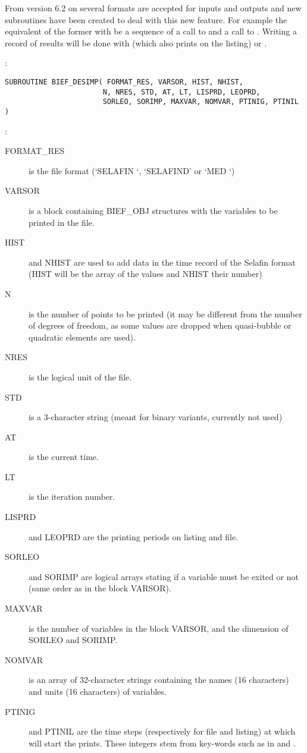 From version 6.2 on several formats are accepted for inputs and outputs and new
subroutines have been created to deal with this new feature. For example the
equivalent of the former  with be a sequence of a call to
 and a call to . Writing a record
of results will be done with  (which also prints on the
listing) or .

:
\begin{lstlisting}[language=TelFortran]
SUBROUTINE BIEF_DESIMP( FORMAT_RES, VARSOR, HIST, NHIST,
                       N, NRES, STD, AT, LT, LISPRD, LEOPRD,
                       SORLEO, SORIMP, MAXVAR, NOMVAR, PTINIG, PTINIL )
\end{lstlisting}

:
\begin{description}
  \item [FORMAT\_RES] is the file format (`SELAFIN `, `SELAFIND' or `MED     `)
  \item [VARSOR] is a block containing BIEF\_OBJ structures with the variables
    to be printed in the file.
  \item [HIST] and NHIST are used to add data in the time record of the Selafin
    format (HIST will be the array of the values and NHIST their number)
  \item [N] is the number of points to be printed (it may be different from the
    number of degrees of freedom, as some values are dropped when quasi-bubble
    or quadratic elements are used).
  \item [NRES] is the logical unit of the file.
  \item [STD] is a 3-character string (meant for binary variants, currently not
    used)
  \item [AT] is the current time.
  \item [LT] is the iteration number.
  \item [LISPRD] and LEOPRD are the printing periods on listing and file.
  \item [SORLEO] and SORIMP are logical arrays stating if a variable must be
    exited or not (same order as in the block VARSOR).
  \item [MAXVAR] is the number of variables in the block VARSOR, and the
    dimension of SORLEO and SORIMP.
  \item [NOMVAR] is an array of 32-character strings containing the names (16
    characters) and units (16 characters) of variables.
  \item [PTINIG] and PTINIL are the time steps (respectively for file and
    listing) at which will start the prints. These integers stem from key-words
    such as  in
     and .
\end{description}

